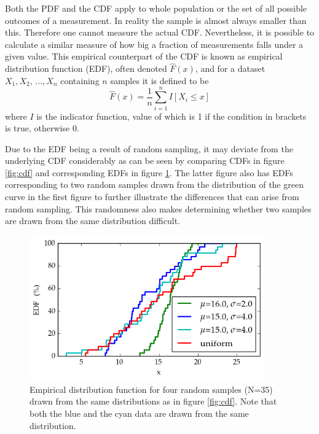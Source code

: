 \documentclass[english, oneside]{HYgradu}
\begin{document}
\reversemarginpar
{}
Both the PDF and the CDF apply to whole population or the set of all possible outcomes of a measurement. In reality the sample is almost always smaller than this. Therefore one cannot measure the actual CDF. Nevertheless, it is possible to calculate a similar measure of how big a fraction of measurements falls under a given value. This empirical counterpart of the CDF is known as empirical distribution function (EDF), often denoted $\hat F(x)$, and for a dataset $X_1, X_2,\,..., X_n$ containing $n$ samples it is defined to be
\begin{equation}
	\hat F(x) = \frac{1}{n}\sum_{i=1}^n I[X_i \leq x]
\end{equation}
where $I$ is the indicator function, value of which is 1 if the condition in brackets is true, otherwise 0. \citep{feigelson2012modern}

Due to the EDF being a result of random sampling, it may deviate from the underlying CDF considerably as can be seen by comparing CDFs in figure \ref{fig:cdf} and corresponding EDFs in figure \ref{fig:edf}. The latter figure also has EDFs corresponding to two random samples drawn from the distribution of the green curve in the first figure to further illustrate the differences that can arise from random sampling. This randomness also makes determining whether two samples are drawn from the same distribution difficult.

\reversemarginpar
{}
\begin{figure}
   \centering
   \includegraphics[width=0.9\textwidth]{kuvat/edf.png}
   \caption{Empirical distribution function for four random samples (N=35) drawn from the same distributions as in figure \ref{fig:cdf}. Note that both the blue and the cyan data are drawn from the same distribution.}
   \label{fig:edf}
\end{figure}
\end{document}
